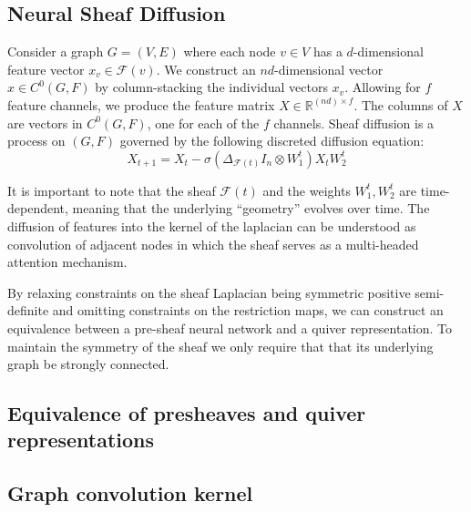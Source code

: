 \documentclass{article}
\theoremstyle{definition}
\begin{document}
\subsection{Neural Sheaf Diffusion}
\label{sec:sheaf-diffusion}

Consider a graph $G = (V, E)$ where each node $v \in V$ has a $d$-dimensional feature vector $x_v \in \mathcal{F}(v)$. We construct an $nd$-dimensional vector $x \in C^0 (G, F)$ by column-stacking the individual vectors $x_v$. Allowing for $f$ feature channels, we produce the feature matrix $X \in \mathbb{R}^{(nd) \times f}$. The columns of $X$ are vectors
in $C^0 (G, F)$, one for each of the $f$ channels. Sheaf diffusion is a process on $(G, F)$ governed by the following discreted diffusion equation: 
\begin{equation}
X_{t+1} = X_t - \sigma(\Delta_{\mathcal{F}(t)} I_n \otimes W^t_1 ) X_t W^t_2
\end{equation}

It is important to note that the sheaf $\mathcal{F}(t)$ and the weights $W^t_1, W^t_2$ are time-dependent, meaning that the underlying ``geometry'' evolves over time. 
The diffusion of features into the kernel of the laplacian can be understood as convolution of adjacent nodes in which the sheaf serves as a multi-headed attention mechanism.


By relaxing constraints on the sheaf Laplacian being symmetric positive semi-definite and omitting constraints on the restriction maps, we can construct an equivalence between a pre-sheaf neural network and a quiver representation. To maintain the symmetry of the sheaf we only require that that its underlying graph be strongly connected. 

\subsection{Equivalence of presheaves and quiver representations}
\label{sec:sheaf-quiver-equiv}

\subsection{Graph convolution kernel}
\label{sec:graph-kernel}
\end{document}
